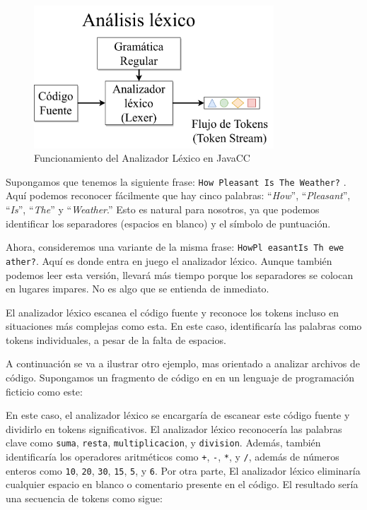 \begin{figure}[H]
	\centering
	\includegraphics[width=0.8\textwidth]{imagenes/analizadorlexico.png}
	\caption{Funcionamiento del Analizador Léxico en JavaCC\cite{ytanalizadorlexico}}
	\label{fig:analizadorlexico}
\end{figure}

Supongamos que tenemos la siguiente frase: \lstinline|How Pleasant Is The Weather?| . Aquí podemos reconocer fácilmente que hay cinco palabras: “\textit{How}”, “\textit{Pleasant}”, “\textit{Is}”, “\textit{The}” y “\textit{Weather}.” Esto es natural para nosotros, ya que podemos identificar los separadores (espacios en blanco) y el símbolo de puntuación.

Ahora, consideremos una variante de la misma frase: \lstinline|HowPl easantIs Th ewe ather?|. Aquí es donde entra en juego el analizador léxico. Aunque también podemos leer esta versión, llevará más tiempo porque los separadores se colocan en lugares impares. No es algo que se entienda de inmediato.

El analizador léxico escanea el código fuente y reconoce los tokens incluso en situaciones más complejas como esta. En este caso, identificaría las palabras como tokens individuales, a pesar de la falta de espacios.

A continuación se va a ilustrar otro ejemplo, mas orientado a analizar archivos de código. Supongamos un fragmento de código en en un lenguaje de programación ficticio como este:

\lstset{inputencoding=utf8/latin1}


En este caso, el analizador léxico se encargaría de escanear este código fuente y dividirlo en tokens significativos. El analizador léxico reconocería las palabras clave como \lstinline|suma|, \lstinline|resta|, \lstinline|multiplicacion|, y \lstinline|division|. Además, también identificaría los operadores aritméticos como \lstinline|+|, \lstinline|-|,  \lstinline|*|, y  \lstinline|/|, además de números enteros como  \lstinline|10|,  \lstinline|20|,  \lstinline|30|,  \lstinline|15|,  \lstinline|5|, y \lstinline|6|. Por otra parte, El analizador léxico eliminaría cualquier espacio en blanco o comentario presente en el código. El resultado sería una secuencia de tokens como sigue:

